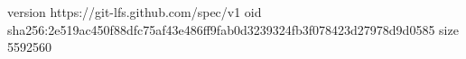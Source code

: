 version https://git-lfs.github.com/spec/v1
oid sha256:2e519ac450f88dfc75af43e486ff9fab0d3239324fb3f078423d27978d9d0585
size 5592560

